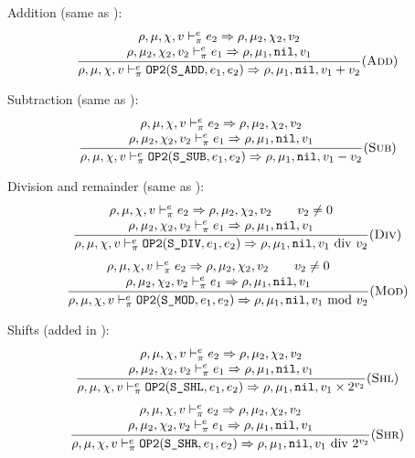 Addition (same as \Cmm):
\[\dfrac{\begin{array}{c}
    \rho,\mu,\chi,v \vdash_\pi^e e_2\Rightarrow \rho,\mu_2,\chi_2,v_2 \\
    \rho,\mu_2,\chi_2,v_2 \vdash_\pi^e e_1\Rightarrow \rho,\mu_1,\texttt{nil},v_1
\end{array}}{\rho,\mu,\chi,v \vdash_\pi^e \texttt{OP2}(\texttt{S\_ADD}, e_1, e_2) \Rightarrow \rho,\mu_1,\texttt{nil},v_1 + v_2}(\textsc{Add})\]

Subtraction (same as \Cmm):
\[\dfrac{\begin{array}{c}
    \rho,\mu,\chi,v \vdash_\pi^e e_2\Rightarrow \rho,\mu_2,\chi_2,v_2 \\
    \rho,\mu_2,\chi_2,v_2 \vdash_\pi^e e_1\Rightarrow \rho,\mu_1,\texttt{nil},v_1
\end{array}}{\rho,\mu,\chi,v \vdash_\pi^e \texttt{OP2}(\texttt{S\_SUB}, e_1, e_2) \Rightarrow \rho,\mu_1,\texttt{nil},v_1 - v_2}(\textsc{Sub})\]

Division and remainder (same as \Cmm):
\[\dfrac{\begin{array}{c}
    \rho,\mu,\chi,v \vdash_\pi^e e_2\Rightarrow \rho,\mu_2,\chi_2,v_2 \qquad v_2\ne 0\\
    \rho,\mu_2,\chi_2,v_2 \vdash_\pi^e e_1\Rightarrow \rho,\mu_1,\texttt{nil},v_1
\end{array}}{\rho,\mu,\chi,v \vdash_\pi^e \texttt{OP2}(\texttt{S\_DIV}, e_1, e_2) \Rightarrow \rho,\mu_1,\texttt{nil},v_1\text{ div } v_2}(\textsc{Div})\]
\[\dfrac{\begin{array}{c}
    \rho,\mu,\chi,v \vdash_\pi^e e_2\Rightarrow \rho,\mu_2,\chi_2,v_2 \qquad v_2\ne 0\\
    \rho,\mu_2,\chi_2,v_2 \vdash_\pi^e e_1\Rightarrow \rho,\mu_1,\texttt{nil},v_1
\end{array}}{\rho,\mu,\chi,v \vdash_\pi^e \texttt{OP2}(\texttt{S\_MOD}, e_1, e_2) \Rightarrow \rho,\mu_1,\texttt{nil},v_1\text{ mod } v_2}(\textsc{Mod})\]

Shifts (added in \Cmp):
\[\dfrac{\begin{array}{c}
    \rho,\mu,\chi,v \vdash_\pi^e e_2\Rightarrow \rho,\mu_2,\chi_2,v_2 \\
    \rho,\mu_2,\chi_2,v_2 \vdash_\pi^e e_1\Rightarrow \rho,\mu_1,\texttt{nil},v_1
\end{array}}{\rho,\mu,\chi,v \vdash_\pi^e \texttt{OP2}(\texttt{S\_SHL}, e_1, e_2) \Rightarrow \rho,\mu_1,\texttt{nil},v_1\times 2^{v_2}}(\textsc{Shl})\]
\[\dfrac{\begin{array}{c}
    \rho,\mu,\chi,v \vdash_\pi^e e_2\Rightarrow \rho,\mu_2,\chi_2,v_2 \\
    \rho,\mu_2,\chi_2,v_2 \vdash_\pi^e e_1\Rightarrow \rho,\mu_1,\texttt{nil},v_1
\end{array}}{\rho,\mu,\chi,v \vdash_\pi^e \texttt{OP2}(\texttt{S\_SHR}, e_1, e_2) \Rightarrow \rho,\mu_1,\texttt{nil},v_1\text{ div } 2^{v_2}} (\textsc{Shr})\]

